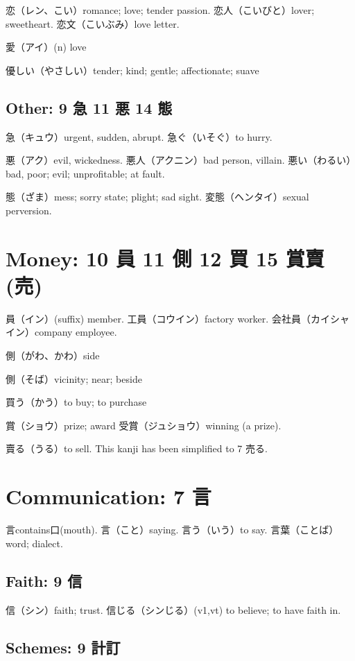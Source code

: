 恋（レン、こい）romance; love; tender passion.
恋人（こいびと）lover; sweetheart.
恋文（こいぶみ）love letter.

愛（アイ）(n) love

優しい（やさしい）tender; kind; gentle; affectionate; suave

\subsection{Other: 9 急 11 悪 14 態}

急（キュウ）urgent, sudden, abrupt.
急ぐ（いそぐ）to hurry.

悪（アク）evil, wickedness.
悪人（アクニン）bad person, villain.
悪い（わるい）bad, poor; evil; unprofitable; at fault.

態（ざま）mess; sorry state; plight; sad sight.
変態（ヘンタイ）sexual perversion.

\section{Money: 10 員 11 側 12 買 15 賞賣(売)}

員（イン）(suffix) member.
工員（コウイン）factory worker.
会社員（カイシャイン）company employee.

側（がわ、かわ）side

側（そば）vicinity; near; beside

買う（かう）to buy; to purchase

賞（ショウ）prize; award
受賞（ジュショウ）winning (a prize).

賣る（うる）to sell.
This kanji has been simplified to 7 売る.

\section{Communication: 7 言}

言contains口(mouth).
言（こと）saying.
言う（いう）to say.
言葉（ことば）word; dialect.

\subsection{Faith: 9 信}

信（シン）faith; trust.
信じる（シンじる）(v1,vt) to believe; to have faith in.

\subsection{Schemes: 9 計訂}


